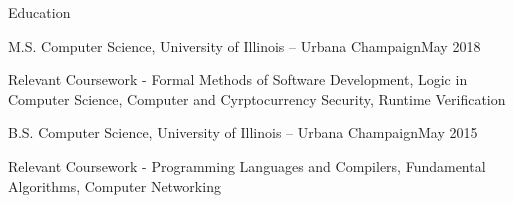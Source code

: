 \documentclass{resume} %
\begin{document}
 
\begin{rSection}{Education}
\begin{rSubsection}{ M.S. Computer Science, University of Illinois -- Urbana Champaign}{May 2018}{}{}
\item Relevant Coursework - Formal Methods of Software Development, Logic in Computer Science, Computer and Cyrptocurrency Security, Runtime Verification
\end{rSubsection}
\begin{rSubsection}{ B.S. Computer Science, University of Illinois -- Urbana Champaign}{May 2015}{}{}
\item Relevant Coursework - Programming Languages and Compilers, Fundamental Algorithms, Computer Networking
\end{rSubsection}
\end{rSection}
\end{document}
